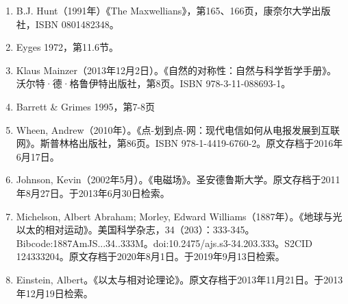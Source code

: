 \begin{enumerate}
\item B.J. Hunt（1991年）《The Maxwellians》，第165、166页，康奈尔大学出版社，ISBN 0801482348。  
\item Eyges 1972，第11.6节。
\item Klaus Mainzer（2013年12月2日）。《自然的对称性：自然与科学哲学手册》。沃尔特·德·格鲁伊特出版社，第8页。ISBN 978-3-11-088693-1。  
\item Barrett & Grimes 1995，第7-8页  
\item Wheen, Andrew（2010年）。《点-划到点-网：现代电信如何从电报发展到互联网》。斯普林格出版社，第86页。ISBN 978-1-4419-6760-2。原文存档于2016年6月17日。  
\item Johnson, Kevin（2002年5月）。《电磁场》。圣安德鲁斯大学。原文存档于2011年8月27日。于2013年6月30日检索。  
\item Michelson, Albert Abraham; Morley, Edward Williams（1887年）。《地球与光以太的相对运动》。美国科学杂志，34（203）：333-345。Bibcode:1887AmJS...34..333M。doi:10.2475/ajs.s3-34.203.333。S2CID 124333204。原文存档于2020年8月1日。于2019年9月13日检索。  
\item Einstein, Albert。《以太与相对论理论》。原文存档于2013年11月21日。于2013年12月19日检索。
\end{enumerate}